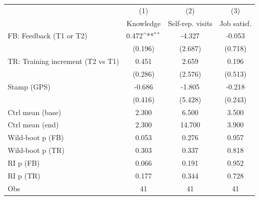 {
\def\sym#1{\ifmmode^{#1}\else\(^{#1}\)\fi}
\begin{tabular}{l*{3}{c}}
\toprule
                    &\multicolumn{1}{c}{(1)}&\multicolumn{1}{c}{(2)}&\multicolumn{1}{c}{(3)}\\
                    &\multicolumn{1}{c}{Knowledge}&\multicolumn{1}{c}{Self-rep. visits}&\multicolumn{1}{c}{Job satisf.}\\
\midrule
FB: Feedback (T1 or T2)&       0.472\sym{**} &      -4.327         &      -0.053         \\
                    &     (0.196)         &     (2.687)         &     (0.718)         \\
TR: Training increment (T2 vs T1)&       0.451         &       2.659         &       0.196         \\
                    &     (0.286)         &     (2.576)         &     (0.513)         \\
Stamp (GPS)         &      -0.686         &      -1.805         &      -0.218         \\
                    &     (0.416)         &     (5.428)         &     (0.243)         \\
\midrule
Ctrl mean (base)    &       2.300         &       6.500         &       3.500         \\
Ctrl mean (end)     &       2.300         &      14.700         &       3.900         \\
Wild-boot p (FB)    &       0.053         &       0.276         &       0.957         \\
Wild-boot p (TR)    &       0.303         &       0.337         &       0.818         \\
RI p (FB)           &       0.066         &       0.191         &       0.952         \\
RI p (TR)           &       0.177         &       0.344         &       0.728         \\
Obs                 &          41         &          41         &          41         \\
\bottomrule
\end{tabular}
}
